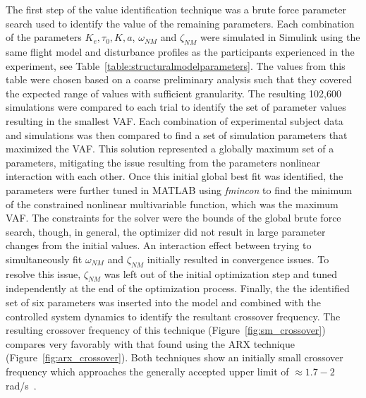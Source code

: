 The first step of the value identification technique was a brute force parameter search used to identify the value of the remaining parameters.
Each combination of the parameters $K_e, \tau_0, K, a$, $\omega_{NM}$ and $\zeta_{NM}$ were simulated in Simulink using the same flight model and disturbance profiles as the participants experienced in the experiment, see Table~\ref{table:structuralmodelparameters}.
The values from this table were chosen based on a coarse preliminary analysis such that they covered the expected range of values with sufficient granularity.
The resulting 102,600 simulations were compared to each trial to identify the set of parameter values resulting in the smallest VAF.
Each combination of experimental subject data and simulations was then compared to find a set of simulation parameters that maximized the VAF.
This solution represented a globally maximum set of a parameters, mitigating the issue resulting from the parameters nonlinear interaction with each other.
Once this initial global best fit was identified, the parameters were further tuned in MATLAB using \textit{fmincon} to find the minimum of the constrained nonlinear multivariable function, which was the maximum VAF.
The constraints for the solver were the bounds of the global brute force search, though, in general, the optimizer did not result in large parameter changes from the initial values.
An interaction effect between trying to simultaneously fit $\omega_{NM}$ and $\zeta_{NM}$ initially resulted in convergence issues.
To resolve this issue, $\zeta_{NM}$ was left out of the initial optimization step and tuned independently at the end of the optimization process.
Finally, the the identified set of six parameters was inserted into the model and combined with the controlled system dynamics to identify the resultant crossover frequency.
The resulting crossover frequency of this technique (Figure~\ref{fig:sm_crossover}) compares very favorably with that found using the ARX technique (Figure~\ref{fig:arx_crossover}).
Both techniques show an initially small crossover frequency which approaches the generally accepted upper limit of $\approx 1.7-2$ rad/s~\citep{hess1984analysis}.

